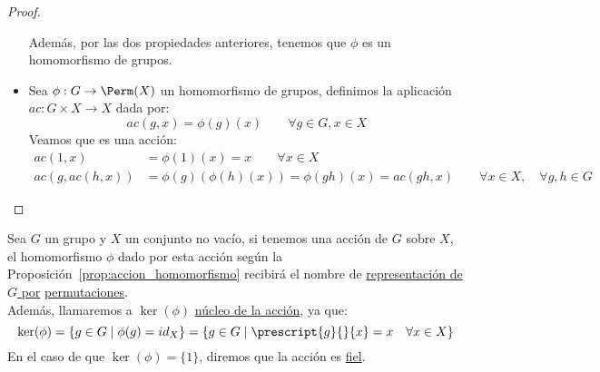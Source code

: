 \begin{prop}
\begin{proof}
\begin{itemize}
                \noindent
                Además, por las dos propiedades anteriores, tenemos que $\phi$ es un homomorfismo de grupos.
            \item Sea $\phi:G\to \Perm(X)$ un homomorfismo de grupos, definimos la aplicación $ac:G\times X \to X$ dada por:
                \begin{equation*}
                    ac(g,x) = \phi(g)(x) \qquad \forall g\in G, x\in X
                \end{equation*}
                Veamos que es una acción:
                \begin{align*}
                    ac(1,x) &= \phi(1)(x) = x \qquad \forall x\in X \\
                    ac(g,ac(h,x)) &= \phi(g)(\phi(h)(x)) = \phi(gh)(x) = ac(gh,x)  \qquad \forall x\in X, \quad \forall g,h\in G
                \end{align*} \qedhere
        \end{itemize}
    \end{proof}
\end{prop}

\begin{definicion}
    Sea $G$ un grupo y $X$ un conjunto no vacío, si tenemos una acción de $G$ sobre $X$, el homomorfismo $\phi$ dado por esta acción según la Proposición~\ref{prop:accion_homomorfismo} recibirá el nombre de \underline{representación de $G$ por} \underline{permutaciones}.\\

    \noindent
    Además, llamaremos a $\ker(\phi)$ \underline{núcleo de la acción}, ya que:
    \begin{equation*}
        \ker(\phi) = \{g\in G \mid \phi(g) = id_X\} = \{g\in G \mid \prescript{g}{}{x} = x \quad \forall x\in X\}
    \end{equation*}
    En el caso de que $\ker(\phi) = \{1\}$, diremos que la acción es \underline{fiel}.
\end{definicion}

